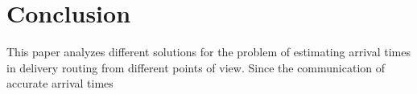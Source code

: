 \chapter{Conclusion}

This paper analyzes different solutions for the problem of estimating arrival times in delivery routing from different points of view. Since the communication of accurate arrival times 